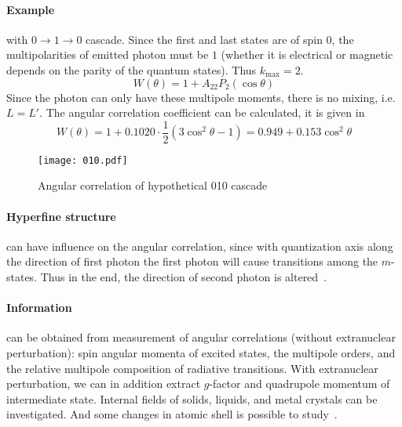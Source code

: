 \paragraph{Example} with $0 \rightarrow 1 \rightarrow 0$ \gag cascade. Since the first and last states are of spin $0$, the multipolarities of emitted photon must be $1$ (whether it is electrical or magnetic depends on the parity of the quantum states). Thus $k_\text{max} = 2$.
\begin{equation}
   W(\theta) = 1 + A_{22} P_2(\cos \theta)
\end{equation}
Since the photon can only have these multipole moments, there is no mixing, i.e.~$L=L'$. The angular correlation coefficient can be calculated, it is given in~\cite{siegbahn}
\begin{equation}
   W(\theta) = 1 + 0.1020 \cdot \frac{1}{2} \left( 3 \cos^2 \theta - 1 \right) = 0.949 + 0.153 \cos^2 \theta
\end{equation}

\begin{figure}[ht]
   \centering
   \texttt{[image: 010.pdf]}
   \caption{Angular correlation of hypothetical 010 cascade}%
\end{figure}

\paragraph{Hyperfine structure} can have influence on the angular correlation, since with quantization axis along the direction of first photon the first photon will cause transitions among the $m$-states. Thus in the end, the direction of second photon is altered~\cite{siegbahn}.


\paragraph{Information} can be obtained from measurement of \gag angular correlations (without extranuclear perturbation): spin angular momenta of excited states, the multipole orders, and the relative multipole composition of radiative transitions\cite{RAWilson}. With extranuclear perturbation, we can in addition extract $g$-factor and quadrupole momentum of intermediate state. Internal fields of solids, liquids, and metal crystals can be investigated. And some changes in atomic shell is possible to study~\cite{siegbahn}.



